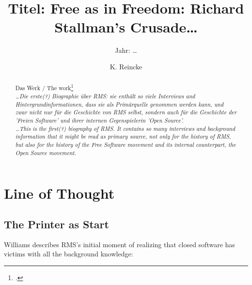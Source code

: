 \documentclass[DIV=calc,BCOR=5mm,11pt,headings=small,oneside,abstract=true, toc=bib]{scrartcl}
\begin{document}

\titlehead{Literaturexzerpt}
\subject{Autor(en): Williams / Williams2002a}
\title{Titel: Free as in Freedom: Richard Stallman's Crusade\ldots}
\subtitle{Jahr: \ldots }
\author{K. Reincke}

\maketitle

\begin{abstract}
Das Werk / The work\footcite[][]{Williams2002a} \\
\noindent \itshape
\ldots Die erste(?) Biographie über RMS: sie enthält so viele Interviews and
Hintergrundinformationen, dass sie als Primärquelle genommen werden kann, und
zwar nicht nur für die Geschichte von RMS selbst, sondern auch für die
Geschichte der 'Freien Software' und ihrer internen Gegenspielerin 'Open Source'. \\
\noindent
\ldots This is the first(?) biography of RMS. It contains so many interviews and
background information that it might be read as primary source, not only for the
history of RMS, but also for the history of the Free Software movement and its
internal counterpart, the Open Source movement.
\end{abstract}
\footnotesize
\normalsize

\section{Line of Thought}

\subsection{The Printer as Start}

Williams describes RMS's initial moment of realizing that closed software has
victims with all the background knowledge:
\end{document}
